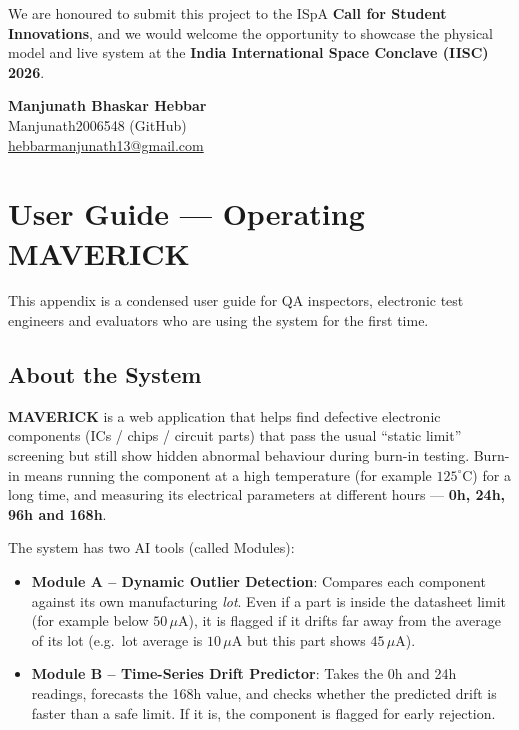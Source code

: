 \documentclass[11pt,a4paper]{article}
\begin{document}
We are honoured to submit this project to the ISpA \textbf{Call for Student Innovations}, and we
would welcome the opportunity to showcase the physical model and live system at the
\textbf{India International Space Conclave (IISC) 2026}.

\vspace{1cm}
\begin{flushright}
\textbf{Manjunath Bhaskar Hebbar}\\
Manjunath2006548 (GitHub) \\
\href{mailto:hebbarmanjunath13@gmail.com}{hebbarmanjunath13@gmail.com}
\end{flushright}

\clearpage
\appendix
\section{User Guide --- Operating MAVERICK}
\label{app:userguide}

This appendix is a condensed user guide for QA inspectors, electronic test engineers and
evaluators who are using the system for the first time.

\subsection{About the System}
\textbf{MAVERICK} is a web application that helps find defective electronic components (ICs /
chips / circuit parts) that pass the usual ``static limit'' screening but still show hidden
abnormal behaviour during burn-in testing. Burn-in means running the component at a high
temperature (for example $125^{\circ}$C) for a long time, and measuring its electrical
parameters at different hours --- \textbf{0h, 24h, 96h and 168h}.

The system has two AI tools (called Modules):
\begin{itemize}
  \item \textbf{Module A -- Dynamic Outlier Detection}: Compares each component against its own
        manufacturing \textit{lot}. Even if a part is inside the datasheet limit (for example
        below $50\,\mu$A), it is flagged if it drifts far away from the average of its lot
        (e.g.\ lot average is $10\,\mu$A but this part shows $45\,\mu$A).
  \item \textbf{Module B -- Time-Series Drift Predictor}: Takes the 0h and 24h readings,
        forecasts the 168h value, and checks whether the predicted drift is faster than a safe
        limit. If it is, the component is flagged for early rejection.
\end{itemize}
\end{document}
